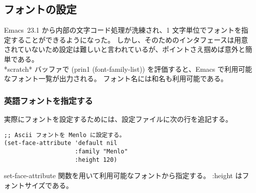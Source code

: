 \subsection{フォントの設定}
Emacs~23.1 から内部の文字コード処理が洗練され、1 文字単位でフォントを指定することができるようになった。
しかし、そのためのインタフェースは用意されていないため設定は難しいと言われているが、ポイントさえ掴めば意外と簡単である。\\

*scratch* バッファで (prin1 (font-family-list)) を評価すると、Emacs で利用可能なフォント一覧が出力される。
フォント名には和名も利用可能である。
\subsubsection{英語フォントを指定する}
実際にフォントを設定するためには、設定ファイルに次の行を追記する。
\begin{mdframed}[roundcorner=0.50zw,leftmargin=3.00zw,rightmargin=3.00zw,skipabove=0.40zw,skipbelow=0.40zw,innertopmargin=4.00pt,innerbottommargin=4.00pt,innerleftmargin=5.00pt,innerrightmargin=5.00pt,linecolor=gray!020,linewidth=0.50pt,backgroundcolor=gray!20]
\begin{verbatim}
;; Ascii フォントを Menlo に設定する。
(set-face-attribute 'default nil
                    :family "Menlo"
                    :height 120)
\end{verbatim}
\end{mdframed}
set-face-attribute 関数を用いて利用可能なフォントから指定する。
:height はフォントサイズである。
